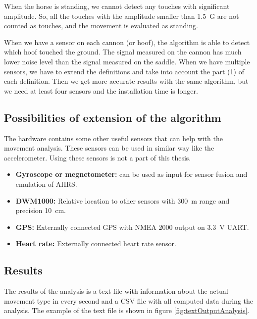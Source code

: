 When the horse is standing, we cannot detect any touches with significant amplitude. So, all the touches with the amplitude smaller than \SI{1.5}{G} are not counted as touches, and the movement is evaluated as standing.

When we have a sensor on each cannon (or hoof), the algorithm is able to detect which hoof touched the ground. The signal measured on the cannon has much lower noise level than the signal measured on the saddle. When we have multiple sensors, we have to extend the definitions and take into account the part (1) of each definition. Then we get more accurate results with the same algorithm, but we need at least four sensors and the installation time is longer.

\subsection{Possibilities of extension of the algorithm}
The  hardware contains some other useful sensors that can help with the movement analysis. These sensors can be used in  similar way like the accelerometer. Using these sensors is not a part of this thesis.
\begin{itemize}
    \item \textbf{Gyroscope or megnetometer:} can be used as input for sensor fusion and emulation of \ac{AHRS}.
    \item \textbf{DWM1000:} Relative location to other sensors with \SI{300}{m} range and precision \SI{10}{cm}.
    \item \textbf{GPS:} Externally connected GPS with NMEA 2000 output on \SI{3.3}{V} \ac{UART}.
    \item \textbf{Heart rate:} Externally connected heart rate sensor.
\end{itemize}

\subsection{Results}
The results of the analysis is a text file with information about the actual movement type in every second and a \ac{CSV} file with all computed data during the analysis. The example of the text file is shown in figure \ref{fig:textOutputAnalysis}.

